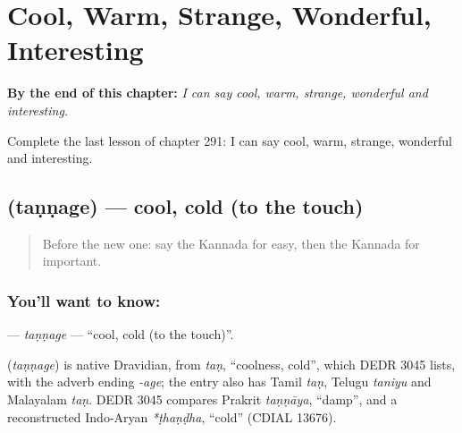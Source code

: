 
\chapter{Cool, Warm, Strange, Wonderful, Interesting}
\label{ch:ka-cool-warm-strange-wonderful-interesting}

\begin{chapteropening}
\textbf{By the end of this chapter:} \emph{I can say cool, warm, strange, wonderful and interesting.}

Complete the last lesson of chapter 291: I can say cool, warm, strange, wonderful and interesting.
\end{chapteropening}

\section[\texorpdfstring{\kn{ತಣ್ಣಗೆ} (taṇṇage)}{ತಣ್ಣಗೆ (taṇṇage)}]{ (taṇṇage) — cool, cold (to the touch)}

\label{lesson:KA-C291-tannage}



\begin{quote}
Before the new one: say the Kannada for easy, then the Kannada for important.
\end{quote}

\subsection*{You'll want to know: }
\textbf{} — \emph{taṇṇage} — \textquotedblleft{}cool, cold (to the touch)\textquotedblright{}.

\begin{cousinweb}
\textbf{} (\emph{taṇṇage}) is native Dravidian, from \emph{taṇ}, \textquotedblleft{}coolness, cold\textquotedblright{}, which DEDR 3045 lists, with the adverb ending \emph{-age}; the entry also has Tamil \emph{taṇ}, Telugu \emph{taniyu} and Malayalam \emph{taṇ}. DEDR 3045 compares Prakrit \emph{taṇṇāya}, \textquotedblleft{}damp\textquotedblright{}, and a reconstructed Indo-Aryan \emph{*ṭhaṇḍha}, \textquotedblleft{}cold\textquotedblright{} (CDIAL 13676).
\end{cousinweb}

